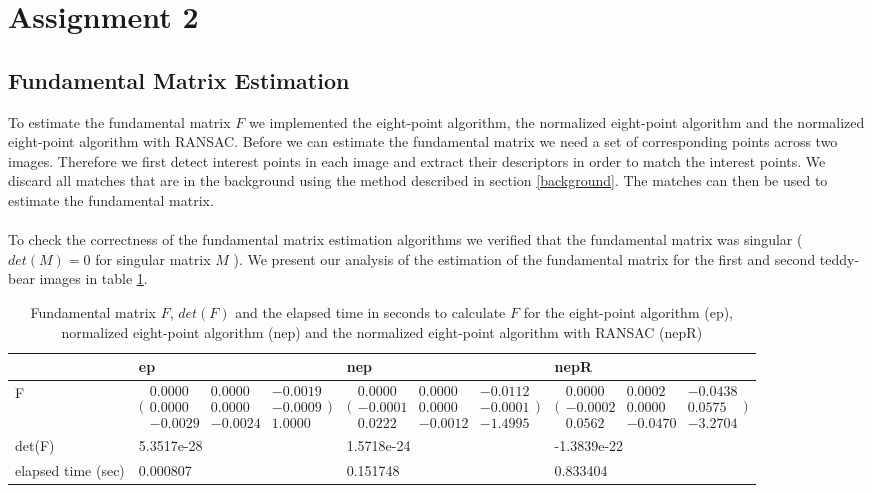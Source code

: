 \documentclass[12pt]{amsart}
\begin{document}
\section{Assignment 2}
\subsection{Fundamental Matrix Estimation}
To estimate the fundamental matrix $F$ we implemented the eight-point algorithm, the normalized eight-point algorithm and the normalized eight-point algorithm with RANSAC. Before we can estimate the fundamental matrix we need a set of corresponding points across two images. Therefore we first detect interest points in each image and extract their descriptors in order to match the interest points. We discard all matches that are in the background using the method described in section \ref{background}. The matches can then be used to estimate the fundamental matrix. \\\\
To check the correctness of the fundamental matrix estimation algorithms we verified that the fundamental matrix was singular ($\textit{det}(M) = 0$ for singular matrix $M$ ). We present our analysis of the estimation of the fundamental matrix for the first and second teddy-bear images in table \ref{fund}.
\begin{table}
\center
    \begin{tabular}{l|l|l|l}
    ~                  & ep & nep & nepR \\ \hline
    F                  
    & $\bigl(\begin{smallmatrix}0.0000&0.0000&-0.0019\\ 0.0000&0.0000&-0.0009\\-0.0029&-0.0024&1.0000\end{smallmatrix} \bigr)$ 
    & $\bigl(\begin{smallmatrix}0.0000&0.0000&-0.0112\\ -0.0001&0.0000&-0.0001\\0.0222&-0.0012&-1.4995\end{smallmatrix} \bigr)$                      
    & $\bigl(\begin{smallmatrix}0.0000&0.0002&-0.0438\\ -0.0002&0.0000&0.0575\\0.0562&-0.0470&-3.2704\end{smallmatrix} \bigr)$                                  \\ \hline
    det(F)             & 5.3517e-28  & 1.5718e-24             & -1.3839e-22                        \\ \hline
    elapsed time (sec) & 0.000807    & 0.151748               & 0.833404                           \\
    \end{tabular}
    \caption{Fundamental matrix $F$, $\textit{det}(F)$ and the elapsed time in seconds to calculate $F$ for the eight-point algorithm (ep), normalized eight-point algorithm (nep) and the normalized eight-point algorithm with RANSAC (nepR)}
        \label{fund}

\end{table}
\end{document}
